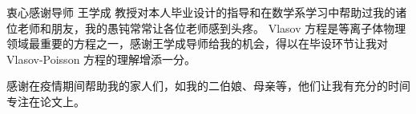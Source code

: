 \begin{acknowledgement}
  衷心感谢导师 王学成 教授对本人毕业设计的指导和在数学系学习中帮助过我的诸位老师和朋友，我的愚钝常常让各位老师感到头疼。 Vlasov 方程是等离子体物理领域最重要的方程之一，感谢王学成导师给我的机会，得以在毕设环节让我对 Vlasov-Poisson 方程的理解增添一分。

  感谢在疫情期间帮助我的家人们，如我的二伯娘、母亲等，他们让我有充分的时间专注在论文上。


\end{acknowledgement}
